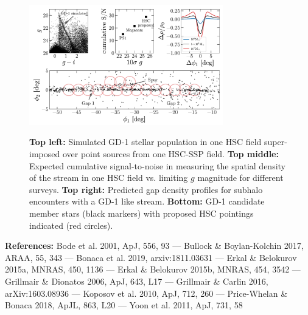 \documentclass[11pt]{article}
\begin{document}
\begin{figure}[t]
\begin{center}
\includegraphics[width=0.75\textwidth]{figure1.pdf}
\caption{
\textbf{Top left:} Simulated GD-1 stellar population in one HSC field super-imposed over point sources from one HSC-SSP field.
\textbf{Top middle:} Expected cumulative signal-to-noise in measuring the spatial density of the stream in one HSC field vs. limiting $g$ magnitude for different surveys.
\textbf{Top right:} Predicted gap density profiles for subhalo encounters with a GD-1 like stream.
\textbf{Bottom:} GD-1 candidate member stars (black markers) with proposed HSC pointings indicated (red circles).
}
\vspace{-2.2em}
\label{fig:}
\end{center}
\end{figure}

{\footnotesize
\textbf{References:}
Bode et al. 2001, ApJ, 556, 93 ---
Bullock \& Boylan-Kolchin 2017, ARAA, 55, 343 ---
Bonaca et al. 2019, arxiv:1811.03631 ---
Erkal \& Belokurov 2015a, MNRAS, 450, 1136 ---
Erkal \& Belokurov 2015b, MNRAS, 454, 3542 ---
Grillmair \& Dionatos 2006, ApJ, 643, L17 ---
Grillmair \& Carlin 2016, arXiv:1603.08936 ---
Koposov et al. 2010, ApJ, 712, 260 ---
Price-Whelan \& Bonaca 2018, ApJL, 863, L20 ---
Yoon et al. 2011, ApJ, 731, 58}
\end{document}
